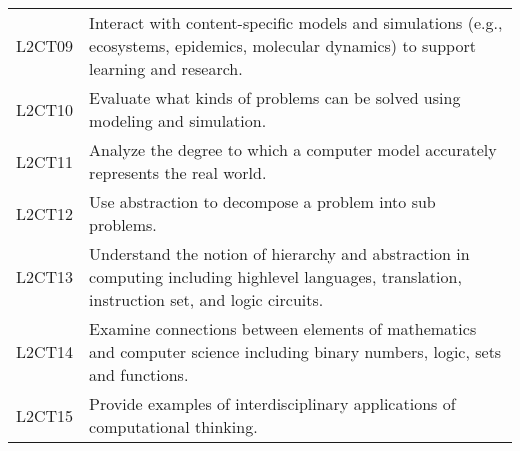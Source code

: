 \begin{longtable}{p{1.8cm}p{11cm}}
 L2CT09  & Interact with content-specific models and simulations (e.g., ecosystems, epidemics, molecular dynamics) to support learning and research.                                                                                  \\
 L2CT10  & Evaluate what kinds of problems can be solved using modeling and simulation.                                                                                                                                               \\
 L2CT11  & Analyze the degree to which a computer model accurately represents the real world.                                                                                                                                         \\
 L2CT12  & Use abstraction to decompose a problem into sub problems.                                                                                                                                                                  \\
 L2CT13  & Understand the notion of hierarchy and abstraction in computing including highlevel languages, translation, instruction set, and logic circuits.                                                                           \\
 L2CT14  & Examine connections between elements of mathematics and computer science including binary numbers, logic, sets and functions.                                                                                              \\
 L2CT15  & Provide examples of interdisciplinary applications of computational thinking.                                                                                                                                              \\

\end{longtable}                                                                                               

